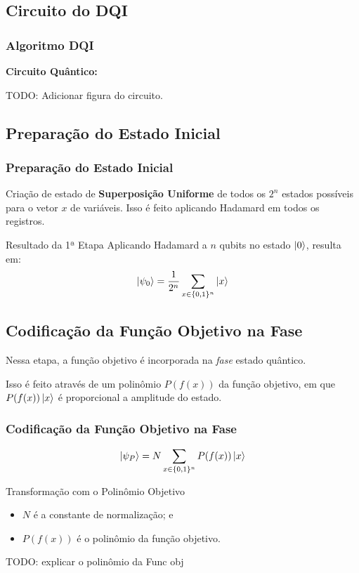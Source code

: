 \documentclass[aspectratio=169]{beamer}
\begin{document}
\subsection{Circuito do DQI}
\begin{frame}
  \frametitle{Algoritmo DQI}

  \textbf{Circuito Quântico:}

  TODO: Adicionar figura do circuito.
    
\end{frame}

\subsection{Preparação do Estado Inicial}

\begin{frame}
  \frametitle{Preparação do Estado Inicial}

  Criação de estado de \textbf{Superposição Uniforme} de todos os $2^n$ estados possíveis para o vetor $x$ de variáveis.
  Isso é feito aplicando Hadamard em todos os registros.

  \vfill

  \begin{block}{Resultado da 1ª Etapa}
  Aplicando Hadamard a $n$ qubits no estado $\ket{0}$, resulta em:
  \[
    \ket{\psi_0}=\frac{1}{2^n} \sum_{x\in\{0,1\}^n}\ket{x}
  \]
  \end{block}
\end{frame}

\subsection{Codificação da Função Objetivo na Fase}

\begin{frame}
  Nessa etapa, a função objetivo é incorporada na \textit{fase} estado quântico. 

  \vfill

  Isso é feito através de um polinômio $P(f(x))$ da função objetivo, em que $P(f(x))\ket{x}$ é proporcional a amplitude do estado.

  \frametitle{Codificação da Função Objetivo na Fase}
  \[
      \ket{\psi_P}=N \sum_{x\in\{0,1\}^n}P(f(x))\ket{x}
  \]
  \begin{block}{Transformação com o Polinômio Objetivo}
      \begin{itemize}
          \item $N$ é a constante de normalização; e
          \item $P(f(x))$ é o polinômio da função objetivo.
      \end{itemize}
  \end{block}

  TODO: explicar o polinômio da Func obj
\end{frame}
\end{document}
